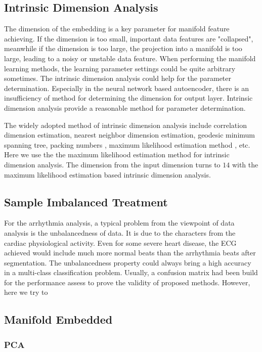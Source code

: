 \documentclass[journal]{IEEEtran}
\begin{document}
\subsection{Intrinsic Dimension Analysis}
The dimension of the embedding is a key parameter for manifold feature achieving.  
If the dimension is too small, important data features are "collapsed", meanwhile if the dimension is too large, the projection into a manifold is too large, leading to a noisy or unstable data feature.
When performing the manifold learning methods, the learning parameter settings could be quite arbitrary sometimes.
The intrinsic dimension analysis could help for the parameter determination.
Especially in the neural network based autoencoder, there is an insufficiency of method for determining the dimension for output layer.
Intrinsic dimension analysis provide a reasonable method for parameter determination.

The widely adopted method of intrinsic dimension analysis include correlation dimension estimation, nearest neighbor dimension estimation\cite{costa2005estimating}, geodesic minimum spanning tree\cite{costa2004geodesic}, packing numbers \cite{kegl2003intrinsic}, maximum likelihood estimation method \cite{levina2005maximum}, etc.
Here we use the the maximum likelihood estimation method for intrinsic dimension analysis.
The dimension from the input dimension turns to $14$ with the maximum likelihood estimation based intrinsic dimension analysis.


\subsection{Sample Imbalanced Treatment}
For the arrhythmia analysis, a typical problem from the viewpoint of data analysis is the unbalancedness of data.
It is due to the characters from the cardiac physiological activity.
Even for some severe heart disease, the ECG achieved would include much more normal beats than the arrhythmia beats after segmentation.
The unbalancedness property could always bring a high accuracy in a multi-class classification problem.
Usually, a confusion matrix had been build for the performance assess to prove the validity of proposed methods.
However, here we try to


\cite{he2009learning}


\subsection{Manifold Embedded}
\subsubsection{PCA}
\end{document}
